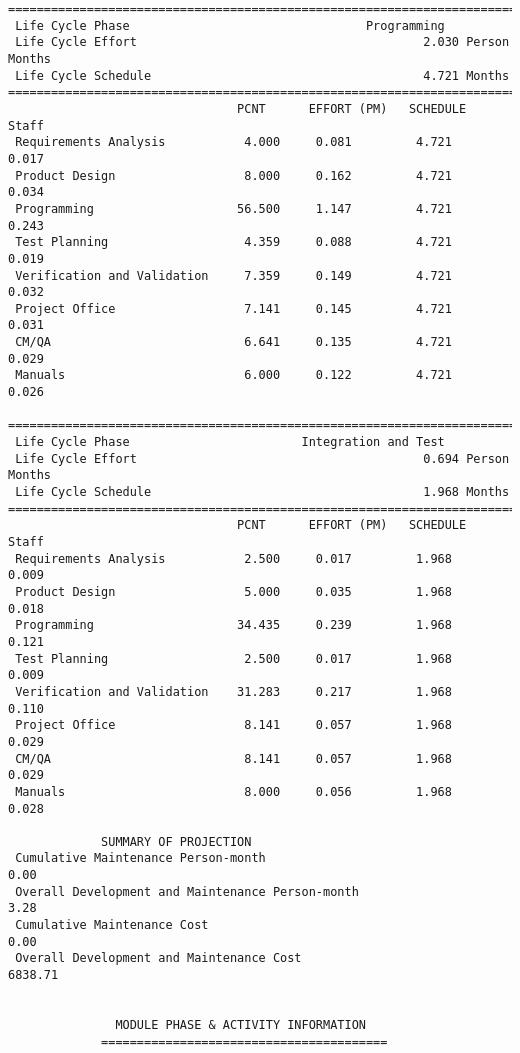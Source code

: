 \documentclass[11pt,a4paper,spanish,twoside]{report}
\begin{document}
{\begin{verbatim}
==============================================================================
 Life Cycle Phase                                 Programming
 Life Cycle Effort                                        2.030 Person Months
 Life Cycle Schedule                                      4.721 Months
==============================================================================
                                PCNT      EFFORT (PM)   SCHEDULE       Staff   
 Requirements Analysis           4.000     0.081         4.721        0.017
 Product Design                  8.000     0.162         4.721        0.034
 Programming                    56.500     1.147         4.721        0.243
 Test Planning                   4.359     0.088         4.721        0.019
 Verification and Validation     7.359     0.149         4.721        0.032
 Project Office                  7.141     0.145         4.721        0.031
 CM/QA                           6.641     0.135         4.721        0.029
 Manuals                         6.000     0.122         4.721        0.026

==============================================================================
 Life Cycle Phase                        Integration and Test
 Life Cycle Effort                                        0.694 Person Months
 Life Cycle Schedule                                      1.968 Months
==============================================================================
                                PCNT      EFFORT (PM)   SCHEDULE       Staff   
 Requirements Analysis           2.500     0.017         1.968        0.009
 Product Design                  5.000     0.035         1.968        0.018
 Programming                    34.435     0.239         1.968        0.121
 Test Planning                   2.500     0.017         1.968        0.009
 Verification and Validation    31.283     0.217         1.968        0.110
 Project Office                  8.141     0.057         1.968        0.029
 CM/QA                           8.141     0.057         1.968        0.029
 Manuals                         8.000     0.056         1.968        0.028

             SUMMARY OF PROJECTION
 Cumulative Maintenance Person-month                                 0.00
 Overall Development and Maintenance Person-month                    3.28
 Cumulative Maintenance Cost                                         0.00
 Overall Development and Maintenance Cost                         6838.71


		       MODULE PHASE & ACTIVITY INFORMATION
		     ========================================


\end{verbatim}}
\end{document}
